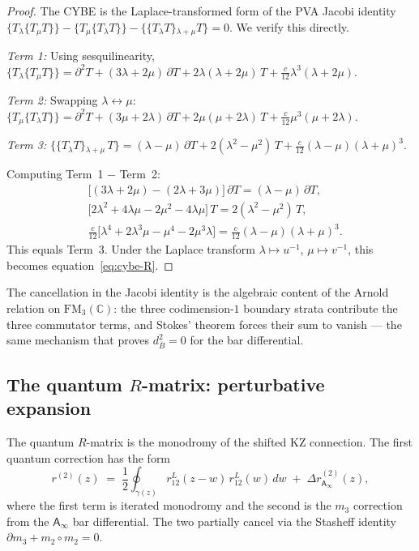 \documentclass[11pt]{article}
\newcommand{\barB}{\overline{B}}
\newcommand{\C}{\mathbb{C}}
\newcommand{\Ainf}{\mathsf{A}_{\infty}}
\newcommand{\FM}{\mathrm{FM}}
\begin{document}
\begin{proof}
The CYBE is the Laplace-transformed form of the PVA
Jacobi identity
$\{T{}_\lambda\{T{}_\mu T\}\}
- \{T{}_\mu\{T{}_\lambda T\}\}
- \{\{T{}_\lambda T\}{}_{\lambda+\mu} T\}
= 0$.
We verify this directly.

\emph{Term 1:} Using sesquilinearity,
$\{T{}_\lambda\{T{}_\mu T\}\}
= \partial^2 T + (3\lambda + 2\mu)\,\partial T
+ 2\lambda(\lambda + 2\mu)\,T
+ \tfrac{c}{12}\lambda^3(\lambda + 2\mu)$.

\emph{Term 2:} Swapping $\lambda \leftrightarrow \mu$:
$\{T{}_\mu\{T{}_\lambda T\}\}
= \partial^2 T + (3\mu + 2\lambda)\,\partial T
+ 2\mu(\mu + 2\lambda)\,T
+ \tfrac{c}{12}\mu^3(\mu + 2\lambda)$.

\emph{Term 3:}
$\{\{T{}_\lambda T\}{}_{\lambda+\mu}\, T\}
= (\lambda - \mu)\,\partial T + 2(\lambda^2 - \mu^2)\,T
+ \tfrac{c}{12}(\lambda - \mu)(\lambda+\mu)^3$.

Computing Term~1 $-$ Term~2:
\begin{align*}
&\bigl[(3\lambda+2\mu) - (2\lambda + 3\mu)\bigr]\,\partial T
= (\lambda - \mu)\,\partial T,\\
&\bigl[2\lambda^2 + 4\lambda\mu - 2\mu^2 - 4\lambda\mu\bigr]\,T
= 2(\lambda^2 - \mu^2)\,T,\\
&\tfrac{c}{12}\bigl[\lambda^4 + 2\lambda^3\mu - \mu^4 - 2\mu^3\lambda\bigr]
= \tfrac{c}{12}(\lambda-\mu)(\lambda+\mu)^3.
\end{align*}
This equals Term~3.  Under the Laplace
transform $\lambda \mapsto u^{-1}$, $\mu \mapsto v^{-1}$,
this becomes equation~\eqref{eq:cybe-R}.
\end{proof}

\begin{remark}
\label{rem:arnold-vir-R}
The cancellation in the Jacobi identity is the algebraic content
of the Arnold relation on $\FM_3(\C)$: the three codimension-$1$
boundary strata contribute the three commutator terms, and Stokes'
theorem forces their sum to vanish --- the same mechanism that
proves $d_{\barB}^2 = 0$ for the bar differential.
\end{remark}

\subsection{The quantum $R$-matrix: perturbative expansion}
\label{subsec:quantum-R-sec}

The quantum $R$-matrix is the monodromy of the shifted KZ connection.
The first quantum correction has the form
\begin{equation}\label{eq:R2-R}
r^{(2)}(z)
\;=\;
\frac{1}{2}\oint_{\gamma(z)}
r^L_{12}(z-w)\,r^L_{12}(w)\,dw
\;+\;
\Delta r^{(2)}_{\Ainf}(z),
\end{equation}
where the first term is iterated monodromy and the second is the
$m_3$ correction from the $\Ainf$ bar differential.  The two
partially cancel via the Stasheff identity
$\partial m_3 + m_2 \circ m_2 = 0$.
\end{document}

